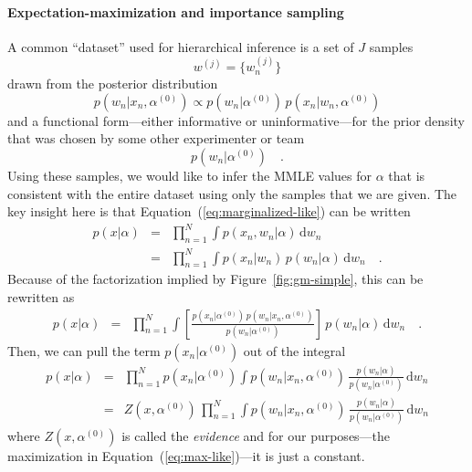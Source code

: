 \documentclass[12pt,preprint]{aastex}
\newcommand{\Fig}[1]{Figure~\ref{fig:#1}}
\newcommand{\fig}[1]{\Fig{#1}}
\newcommand{\Eq}[1]{Equation~(\ref{eq:#1})}
\newcommand{\eq}[1]{\Eq{#1}}
\newcommand{\dd}{\,\mathrm{d}}
\newcommand{\pr}[1]{p ( #1 )}
\begin{document}
\paragraph{Expectation-maximization and importance sampling}
A common ``dataset'' used for hierarchical inference is a set of $J$ samples
\begin{equation}
    w^{(j)} = \{ w_n ^{(j)} \}
\end{equation}
drawn from the posterior distribution
\begin{equation}
    \pr{w_n | x_n, \alpha^{(0)}}
        \propto \pr{w_n | \alpha^{(0)}} \, \pr{x_n | w_n, \alpha^{(0)}}
\end{equation}
and a functional form---either informative or uninformative---for the prior
density that was chosen by some other experimenter or team
\begin{equation}
    \pr{w_n | \alpha^{(0)}} \quad.
\end{equation}
Using these samples, we would like to infer the MMLE values for $\alpha$
that is consistent with the entire dataset using only the samples that
we are given. The key insight here is that \eq{marginalized-like} can be
written
\begin{eqnarray}
    \pr{x | \alpha}
        &=& \prod_{n = 1} ^N \int \pr{x_n, w_n | \alpha} \dd w_n \\
        &=& \prod_{n = 1} ^N \int \pr{x_n | w_n} \, \pr{w_n | \alpha} \dd w_n
    \quad.
\end{eqnarray}
Because of the factorization implied by \fig{gm-simple}, this can be
rewritten as
\begin{eqnarray}
    \pr{x | \alpha}
        &=& \prod_{n = 1} ^N \int
            \left [ \frac{\pr{x_n | \alpha^{(0)}} \,
                \pr{w_n | x_n, \alpha^{(0)}}}{\pr{w_n | \alpha^{(0)}}}  \right ]
            \, \pr{w_n | \alpha} \dd w_n \quad.
\end{eqnarray}
Then, we can pull the term $\pr{x_n | \alpha^{(0)}}$ out of the integral
\begin{eqnarray}
    \pr{x | \alpha} &=& \prod_{n = 1}^N \pr{x_n | \alpha^{(0)}}
        \int \pr{w_n | x_n, \alpha^{(0)}}
        \, \frac{\pr{w_n | \alpha}}{\pr{w_n | \alpha^{(0)}}} \dd w_n \\
    &=& Z(x, \alpha^{(0)}) \, \prod_{n = 1}^N
        \int \pr{w_n | x_n, \alpha^{(0)}}
        \, \frac{\pr{w_n | \alpha}}{\pr{w_n | \alpha^{(0)}}} \dd w_n
\end{eqnarray}
where $Z(x, \alpha^{(0)})$ is called the \emph{evidence} and for our
purposes---the maximization in \eq{max-like}---it is just a constant.
\end{document}
